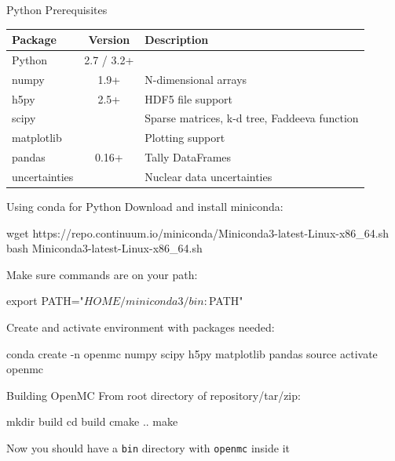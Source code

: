 \documentclass[noamssymb,svgnames]{beamer}
\begin{document}
\begin{frame}{Python Prerequisites}
  \begin{table}
    \centering
    \small{
    \begin{tabular}{lcl}
      \toprule
      \textbf{Package} & \textbf{Version} & \textbf{Description} \\
      \midrule
      Python & 2.7 / 3.2+ &  \\
      numpy & 1.9+ & N-dimensional arrays \\
      h5py & 2.5+ & HDF5 file support \\
      scipy &  & Sparse matrices, k-d tree, Faddeeva function \\
      matplotlib &  & Plotting support \\
      pandas & 0.16+ & Tally DataFrames \\
      uncertainties &  & Nuclear data uncertainties \\
      \bottomrule
    \end{tabular}
    }
  \end{table}
\end{frame}

\begin{frame}[fragile]{Using conda for Python}
  Download and install miniconda:
  \begin{shell}[minted options={fontsize=\tiny}]
    wget https://repo.continuum.io/miniconda/Miniconda3-latest-Linux-x86_64.sh
    bash Miniconda3-latest-Linux-x86_64.sh
  \end{shell}
  \vfill
  Make sure commands are on your path:
  \begin{shell}
    export PATH="$HOME/miniconda3/bin:$PATH"
  \end{shell}
  \vfill
  Create and activate environment with packages needed:
  \begin{shell}[minted options={fontsize=\tiny}]
    conda create -n openmc numpy scipy h5py matplotlib pandas
    source activate openmc
  \end{shell}
\end{frame}

\begin{frame}[fragile]{Building OpenMC}
  From root directory of repository/tar/zip:
  \begin{shell}
    mkdir build
    cd build
    cmake ..
    make
  \end{shell}
  Now you should have a \texttt{bin} directory with
  \textcolor{green!60!black}{\texttt{openmc}} inside it
\end{frame}
\end{document}
